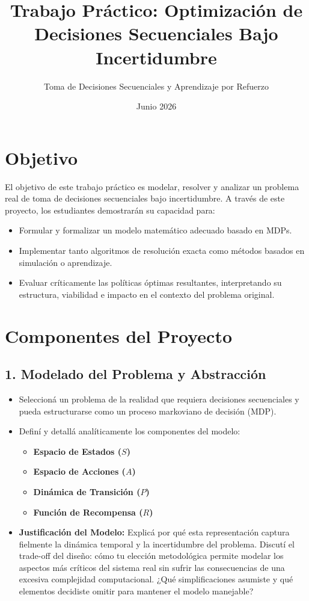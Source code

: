 \documentclass[11pt]{article}
\title{\textbf{Trabajo Práctico: Optimización de Decisiones Secuenciales Bajo Incertidumbre}}
\date{Junio 2026}
\author{Toma de Decisiones Secuenciales y Aprendizaje por Refuerzo}
\begin{document}
\maketitle

\section*{Objetivo}
El objetivo de este trabajo práctico es modelar, resolver y analizar un problema real de toma de decisiones secuenciales bajo incertidumbre. A través de este proyecto, los estudiantes demostrarán su capacidad para:
\begin{itemize}
    \item Formular y formalizar un modelo matemático adecuado basado en MDPs.
    \item Implementar tanto algoritmos de resolución exacta como métodos basados en simulación o aprendizaje.
    \item Evaluar críticamente las políticas óptimas resultantes, interpretando su estructura, viabilidad e impacto en el contexto del problema original.
\end{itemize}

\section*{Componentes del Proyecto}

\subsection*{1. Modelado del Problema y Abstracción}
\begin{itemize}    
\item Seleccioná un problema de la realidad que requiera decisiones secuenciales y pueda estructurarse como un proceso markoviano de decisión (MDP).
\item Definí y detallá analíticamente los componentes del modelo:
\begin{itemize}
    \item \textbf{Espacio de Estados ($S$)}
    \item \textbf{Espacio de Acciones ($A$)}
    \item \textbf{Dinámica de Transición ($P$)} 
    \item \textbf{Función de Recompensa ($R$)} 
\end{itemize}
\item \textbf{Justificación del Modelo:} Explicá por qué esta representación captura fielmente la dinámica temporal y la incertidumbre del problema. Discutí el trade-off del diseño: cómo tu elección metodológica permite modelar los aspectos más críticos del sistema real sin sufrir las consecuencias de una excesiva complejidad computacional. ¿Qué simplificaciones asumiste y qué elementos decidiste omitir para mantener el modelo manejable?
\end{itemize}
\end{document}
